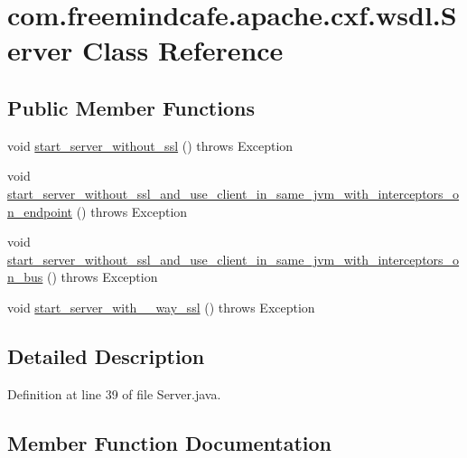 \hypertarget{classcom_1_1freemindcafe_1_1apache_1_1cxf_1_1wsdl_1_1_server}{}\section{com.\+freemindcafe.\+apache.\+cxf.\+wsdl.\+Server Class Reference}
\label{classcom_1_1freemindcafe_1_1apache_1_1cxf_1_1wsdl_1_1_server}
\subsection*{Public Member Functions}
\begin{DoxyCompactItemize}
\item 
void \hyperlink{classcom_1_1freemindcafe_1_1apache_1_1cxf_1_1wsdl_1_1_server_a8bd05da89b042b6f57afc85b53ed1f4c}{start\+\_\+server\+\_\+without\+\_\+ssl} ()  throws Exception
\item 
void \hyperlink{classcom_1_1freemindcafe_1_1apache_1_1cxf_1_1wsdl_1_1_server_afb42973c933704e8fef68096e8273e6b}{start\+\_\+server\+\_\+without\+\_\+ssl\+\_\+and\+\_\+use\+\_\+client\+\_\+in\+\_\+same\+\_\+jvm\+\_\+with\+\_\+interceptors\+\_\+on\+\_\+endpoint} ()  throws Exception
\item 
void \hyperlink{classcom_1_1freemindcafe_1_1apache_1_1cxf_1_1wsdl_1_1_server_a3290ab3612c4faae4b6eaa1a7d6b95b3}{start\+\_\+server\+\_\+without\+\_\+ssl\+\_\+and\+\_\+use\+\_\+client\+\_\+in\+\_\+same\+\_\+jvm\+\_\+with\+\_\+interceptors\+\_\+on\+\_\+bus} ()  throws Exception
\item 
void \hyperlink{classcom_1_1freemindcafe_1_1apache_1_1cxf_1_1wsdl_1_1_server_a51a0e0743c909bdf8a03595037ab7ebe}{start\+\_\+server\+\_\+with\+\_\+\_\+way\+\_\+ssl} ()  throws Exception
\end{DoxyCompactItemize}


\subsection{Detailed Description}


Definition at line 39 of file Server.\+java.



\subsection{Member Function Documentation}
\hypertarget{classcom_1_1freemindcafe_1_1apache_1_1cxf_1_1wsdl_1_1_server_a51a0e0743c909bdf8a03595037ab7ebe}{}
